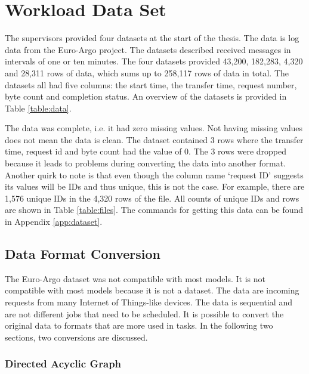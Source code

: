 

\section{Workload Data Set}\label{sec:data}

The supervisors provided four datasets at the start of the thesis. The data is
log data from the Euro-Argo project. The datasets
described received messages in intervals of one or ten minutes. The four
datasets provided 43,200, 182,283, 4,320 and 28,311 rows of data, which sums
up to 258,117 rows of data in total. The datasets all had five columns: the
start time, the transfer time, request number, byte count and completion
status. An overview of the datasets is provided in Table \ref{table:data}.



The data was complete, i.e. it had zero missing values. Not having missing
values does not mean the data is clean. The dataset contained 3 rows where the
transfer time, request id and byte count had the value of 0. The 3 rows were
dropped because it leads to problems during converting the data into
another format. Another quirk to note is that even though the column
name `request ID' suggests its values will be IDs and thus unique, this
is not the case. For example, there are 1,576 unique IDs in the 4,320 rows of
the  file. All counts of unique IDs and rows are
shown in Table \ref{table:files}. The commands for getting this data can be
found in Appendix \ref{app:dataset}.



\subsection{Data Format Conversion}

The Euro-Argo dataset was not compatible with most models. It is not
compatible with most models because it is not a \jss dataset. The data are
incoming requests from many Internet of Things-like devices. The data is
sequential and are not different jobs that need to be scheduled. It is
possible to convert the original data to formats that are more used in \jss
tasks. In the following two sections, two conversions are discussed.


\subsubsection{Directed Acyclic Graph}\label{sec:dag}

